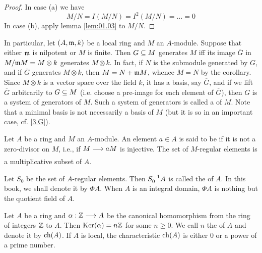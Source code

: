 \documentclass[../main]{subfiles}
\begin{document}
\begin{proof}
In case (a) we have
\[M/N = I(M/N) = I^2(M/N) = \ldots = 0\]
In case (b), apply lemma \ref{lem:01.03} to $M/N$.
\end{proof}

\newparagraph
In particular, let $(A,\mathfrak{m},k)$ be a local ring and $M$ an $A$-module. Suppose that either $\mathfrak{m}$ is nilpotent or $M$ is finite. Then $G\subseteq M$ generates $M$ iff its image $\overline G$ in $M/\mathfrak{m}M=M\otimes k$ generates $M\otimes k$. In fact, if $N$ is the submodule generated by $G$, and if $\overline G$ generates $M\otimes k$, then $M=N+\mathfrak{m}M$, whence $M=N$ by the corollary. Since $M\otimes k$ is a vector space over the field $k$, it has a basis, say $\overline G$, and if we lift $\overline G$ arbitrarily to $G\subseteq M$ (i.e. choose a pre-image for each element of $\overline G$), then $G$ is a system of generators of $M$. Such a system of generators is called a  of $M$. Note that a minimal basis is not necessarily a basis of $M$ (but it is so in an important case, cf. \ref{3.G}).

\newparagraph
Let $A$ be a ring and $M$ an $A$-module. An element $a\in A$ is said to be  if it is not a zero-divisor on $M$, i.e., if $M\varrightarrow{} aM$ is injective. The set of $M$-regular elements is a multiplicative subset of $A$.

Let $S_0$ be the set of $A$-regular elements. Then $S_0^{-1} A$ is called the  of $A$. In this book, we shall denote it by $\Phi A$.\label{sym:Phi} When $A$ is an integral domain, $\Phi A$ is nothing but the quotient field of $A$.

\newparagraph
Let $A$ be a ring and $\alpha:\mathbb{Z}\longrightarrow A$ be the canonical homomorphism from the ring of integers $\mathbb{Z}$ to $A$. Then $\operatorname{Ker}(\alpha)=n\mathbb{Z}$ for some $n\ge0$. We call $n$ the  of $A$ and denote it by $\operatorname{ch}(A)$. If $A$ is local, the characteristic $\operatorname{ch}(A)$ is either 0 or a power of a prime number.
\end{document}
